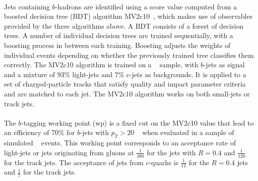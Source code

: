 \paragraph{}
Jets containing $b$-hadrons are identified using a score value computed from a boosted decision tree (BDT) algorithm MV2c10~\cite{btaggingRun2, Aad:2015ydr}, which makes use of observables provided by the three algorithms above.
A BDT consists of a forest of decision trees.
A number of individual decision trees are trained sequentially, with a boosting process in between each training. 
Boosting adjusts the weights of individual events depending on whether the previously trained tree classifies them correctly.
The MV2c10 algorithm is trained on a \ttbar~ sample, with $b$-jets as signal and a mixture of $93\%$ light-jets and $7\%$ c-jets as backgrounds. 
It is applied to a set of charged-particle tracks that satisfy quality and impact parameter criteria and are matched to each jet.
The MV2c10 algorithm works on both small-\R jets or track jets.

\paragraph{}
The $b$-tagging working point (wp) is a fixed cut on the MV2c10 value that lead to an efficiency of 70\% for $b$-jets with $p_T > 20$ \GeV~ when evaluated in a sample of simulated \ttbar~ events. 
This working point corresponds to an acceptance rate of light-jets or jets originating from gluons at $\frac{1}{380}$ for the jets with $R=0.4$ and $\frac{1}{120}$ for the track jets. The acceptance of jets from $c$-quarks is $\frac{1}{12}$ for the $R=0.4$ jets and $\frac{1}{7}$ for the track jets.

